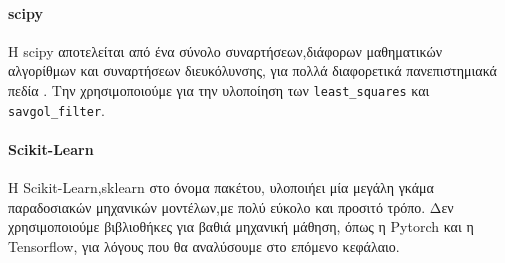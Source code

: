 \paragraph{scipy}

Η scipy αποτελείται από ένα σύνολο συναρτήσεων,διάφορων μαθηματικών αλγορίθμων και συναρτήσεων διευκόλυνσης,
για πολλά διαφορετικά πανεπιστημιακά πεδία  \cite{scipy}.
Την χρησιμοποιούμε για την υλοποίηση των \texttt{least\_squares} και \texttt{savgol\linebreak \_filter}.

\paragraph{Scikit-Learn}

H Scikit-Learn,sklearn στο όνομα πακέτου, υλοποιήει μία μεγάλη γκάμα παραδοσιακών μηχανικών μοντέλων,με πολύ εύκολο και προσιτό τρόπο\cite{scikitLearn}.
Δεν χρησιμοποιούμε βιβλιοθήκες για βαθιά μηχανική μάθηση, όπως η Pytorch και η Tensorflow, για λόγους που θα αναλύσουμε στο επόμενο κεφάλαιο.